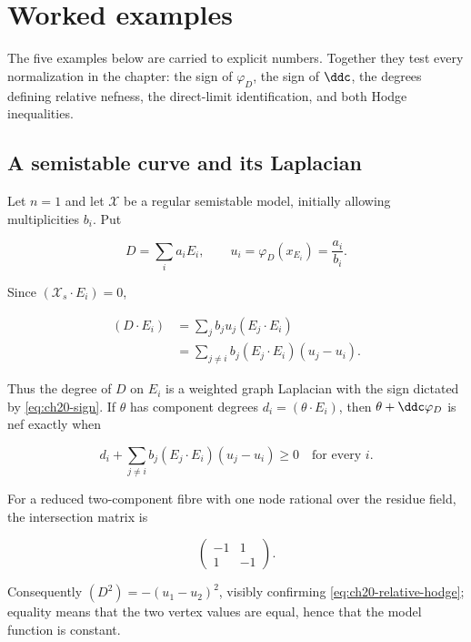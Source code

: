 \section{Worked examples}
\label{sec:ch20-examples}

The five examples below are carried to explicit numbers.  Together they test
every normalization in the chapter: the sign of \(\varphi_D\), the sign of
\(\ddc\), the degrees defining relative nefness, the direct-limit
identification, and both Hodge inequalities.

\subsection{A semistable curve and its Laplacian}
\label{sec:ch20-ex-curve}

\begin{example}
\label{ex:ch20-semistable-curve}
Let \(n=1\) and let \(\mathcal X\) be a regular semistable model, initially
allowing multiplicities \(b_i\).  Put

\begin{equation}
\label{eq:ch20-curve-values}
       D=\sum_i a_iE_i,
       \qquad u_i=\varphi_D(x_{E_i})=\frac{a_i}{b_i}.
\end{equation}

Since \((\mathcal X_s\cdot E_i)=0\),

\begin{equation}
\label{eq:ch20-graph-laplacian}
 \begin{aligned}
 (D\cdot E_i)
 &=\sum_j b_ju_j(E_j\cdot E_i)\\
 &=\sum_{j\neq i}b_j(E_j\cdot E_i)(u_j-u_i).
 \end{aligned}
\end{equation}

Thus the degree of \(D\) on \(E_i\) is a weighted graph Laplacian with the
sign dictated by \eqref{eq:ch20-sign}.  If \(\theta\) has component degrees
\(d_i=(\theta\cdot E_i)\), then \(\theta+\ddc\varphi_D\) is nef exactly
when

\begin{equation}
\label{eq:ch20-curve-nef-test}
 d_i+\sum_{j\neq i}b_j(E_j\cdot E_i)(u_j-u_i)\geq0
 \quad\text{for every }i.
\end{equation}

For a reduced two-component fibre with one node rational over the residue
field, the intersection matrix is

\begin{equation}
\label{eq:ch20-two-component-matrix}
              \begin{pmatrix}-1&1\\1&-1\end{pmatrix}.
\end{equation}

Consequently
\((D^2)=-(u_1-u_2)^2\), visibly confirming
\eqref{eq:ch20-relative-hodge}; equality means that the two vertex values
are equal, hence that the model function is constant.
\end{example}

